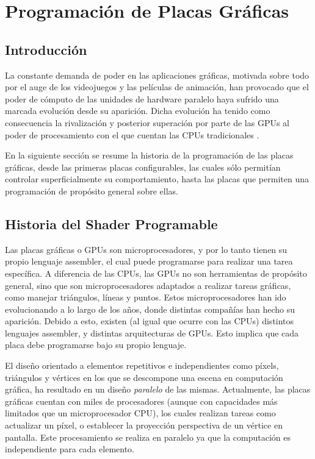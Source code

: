 \chapter{Programación de Placas Gráficas}

\section{Introducci\'on}
La constante demanda de poder en las aplicaciones gr\'aficas, motivada sobre todo por el auge de los videojuegos y las películas de animación, han provocado que el poder de cómputo de las unidades de hardware paralelo haya sufrido una marcada evoluci\'on desde su aparici\'on.
Dicha evoluci\'on ha tenido como consecuencia la rivalizaci\'on y posterior superaci\'on por parte de las GPUs al poder de procesamiento con el que cuentan las CPUs tradicionales \cite{Harris06}.

En la siguiente sección se resume la historia de la programación de las placas gráficas, desde las primeras placas configurables, las cuales sólo permitían controlar superficialmente su comportamiento, hasta las placas que permiten una programación de propósito general sobre ellas.

\section{Historia del Shader Programable}
Las placas gráficas o GPUs son microprocesadores, y por lo tanto tienen su propio lenguaje assembler, el cual puede programarse para realizar una tarea específica.
A diferencia de las CPUs, las GPUs no son herramientas de propósito general, sino que son microprocesadores adaptados a realizar tareas gráficas, como manejar triángulos, líneas y puntos.
Estos microprocesadores han ido evolucionando a lo largo de los años, donde distintas compañías han hecho su aparición.
Debido a esto, existen (al igual que ocurre con las CPUs) distintos lenguajes assembler, y distintas arquitecturas de GPUs.
Esto implica que cada placa debe programarse bajo su propio lenguaje.

El diseño orientado a elementos repetitivos e independientes como píxels, triángulos y vértices en los que se descompone una escena en computación gráfica, ha resultado en un diseño {\em paralelo} de las mismas.
Actualmente, las placas gráficas cuentan con miles de procesadores (aunque con capacidades más limitados que un microprocesador CPU), los cuales realizan tareas como actualizar un píxel, o establecer la proyección perspectiva de un vértice en pantalla.
Este procesamiento se realiza en paralelo ya que la computación es independiente para cada elemento.


